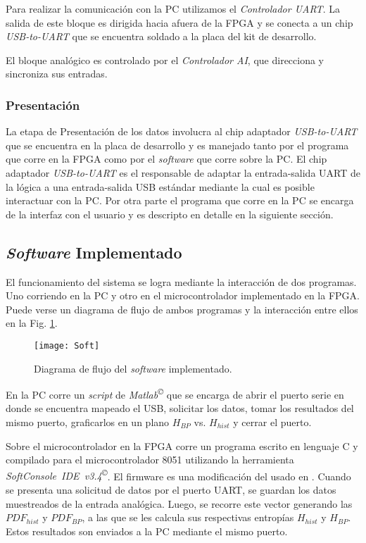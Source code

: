 Para realizar la comunicación con la PC utilizamos el \textit{Controlador UART}.
La salida de este bloque es dirigida hacia afuera de la FPGA y se conecta a un chip \textit{USB-to-UART} que se encuentra soldado a la placa del kit de desarrollo.

El bloque analógico es controlado por el \textit{Controlador AI}, que direcciona y sincroniza sus entradas.

\subsubsection{Presentación}

La etapa de Presentación de los datos involucra al chip adaptador \textit{USB-to-UART} que se encuentra en la placa de desarrollo y es manejado tanto por el programa que corre en la FPGA como por el \textit{software} que corre sobre la PC.
El chip adaptador \textit{USB-to-UART} es el responsable de adaptar la entrada-salida UART de la lógica a una entrada-salida USB estándar mediante la cual es posible interactuar con la PC.
Por otra parte el programa que corre en la PC se encarga de la interfaz con el usuario y es descripto en detalle en la siguiente sección.

\subsection{\textit{Software} Implementado}
\label{sec:Software}

El funcionamiento del sistema se logra mediante la interacción de dos programas.
Uno corriendo en la PC y otro en el microcontrolador implementado en la FPGA.
Puede verse un diagrama de flujo de ambos programas y la interacción entre ellos en la Fig. \ref{fig.softflow}.

\begin{figure}[htpb]
	\centering\texttt{[image: Soft]}
	\caption{Diagrama de flujo del \textit{software} implementado.}\label{fig.softflow}
\end{figure}

En la PC corre un \textit{script} de \textit{Matlab\textsuperscript\copyright} que se encarga de abrir el puerto serie en donde se encuentra mapeado el USB, solicitar los datos, tomar los resultados del mismo puerto, graficarlos en un plano $H_{BP}$ vs. $H_{hist}$ y cerrar el puerto.

Sobre el microcontrolador en la FPGA corre un programa escrito en lenguaje C y compilado para el microcontrolador 8051 utilizando la herramienta \textit{SoftConsole~IDE~v3.4\textsuperscript\copyright}.
El firmware es una modificación del usado en \cite{Core8051sS}. Cuando se presenta una solicitud de datos por el puerto UART, se guardan los datos muestreados de la entrada analógica.
Luego, se recorre este vector generando las $PDF_{hist}$ y $PDF_{BP}$, a las que se les calcula sus respectivas entropías $H_{hist}$ y $H_{BP}$.
Estos resultados son enviados a la PC mediante el mismo puerto.

